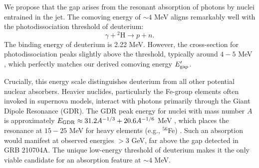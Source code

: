 \documentclass[linenumbers,twocolumn]{aastex631}
\begin{document}
We propose that the gap arises from the resonant absorption of photons by nuclei entrained in the jet. The comoving energy of $\sim 4$ MeV aligns remarkably well with the photodissociation threshold of deuterium:
\begin{equation}
\gamma + {^2\text{H}} \rightarrow p + n.
\end{equation}
The binding energy of deuterium is 2.22 MeV. However, the cross-section for photodissociation peaks slightly above the threshold, typically around $4-5$ MeV \citep{IAEA2000}, which perfectly matches our derived comoving energy $E_{\rm gap}^{\prime}$.

Crucially, this energy scale distinguishes deuterium from all other potential nuclear absorbers. Heavier nuclides, particularly the Fe-group elements often invoked in supernova models, interact with photons primarily through the Giant Dipole Resonance (GDR). The GDR peak energy for nuclei with mass number $A$ is approximately $E_{\rm GDR} \approx 31.2 A^{-1/3} + 20.6 A^{-1/6}$ MeV \citep{1975RvMP...47..713B}, which places the resonance at $15-25$ MeV for heavy elements (e.g., $^{56}$Fe) \citep{2020NuDS..163..109K}. Such an absorption would manifest at observed energies $>3$ GeV, far above the gap detected in GRB 210704A. The unique low-energy threshold of deuterium makes it the only viable candidate for an absorption feature at $\sim 4$ MeV.
\end{document}
